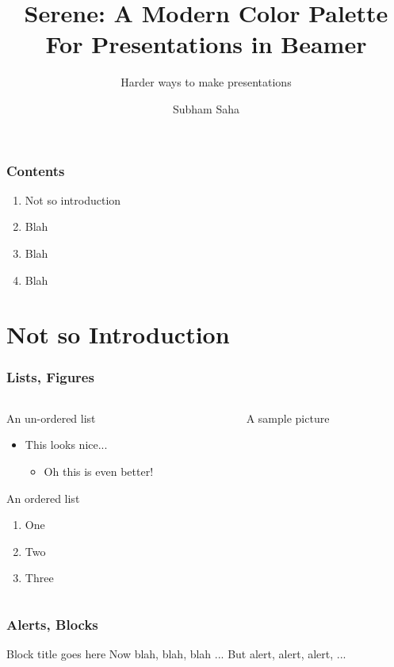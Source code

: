 \documentclass{beamer}
\title{Serene: A Modern Color Palette For Presentations in Beamer}
\subtitle{Harder ways to make presentations}
\author{Subham Saha}
\begin{document}
\noProgressBar
\maketitle

\begin{frame}
	\frametitle{Contents}
	\begin{enumerate}
		\item Not so introduction
		\item Blah
		\item Blah
		\item Blah
	\end{enumerate}
\end{frame}

\startProgressBar
\section{Not so Introduction}
	\begin{frame}
		\frametitle{Lists, Figures}
		\begin{columns}
			\begin{column}{0.5\textwidth}
				
		An un-ordered list
		\begin{itemize}
			\item This looks nice...
			\begin{itemize}
				\item Oh this is even better!
			\end{itemize}
		\end{itemize}
		An ordered list
		\begin{enumerate}
			\item One
			\item Two
			\item Three
		\end{enumerate}
		
		\end{column}
		\begin{column}{0.4\textwidth}
			\begin{figure}
			\caption{A sample picture}
			\end{figure}
		\end{column}
	\end{columns}
				
	\end{frame}
	
	\begin{frame}
		\frametitle{Alerts, Blocks}
		\begin{block}{Block title goes here}
			Now blah, blah, blah ...
			But \alert{alert}, \alert{alert}, \alert{alert}, ...
		\end{block}
		
		
	\end{frame}
\end{document}
